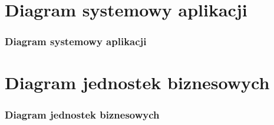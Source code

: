 \documentclass[hyperref={pdfpagelabels=false}]{beamer}
\begin{document}
\section[Diagram systemowy]{Diagram systemowy aplikacji}
\begin{frame}
	\frametitle{Diagram systemowy aplikacji}
	\begin{figure}
	\end{figure}
\end{frame}
\section[Diagram biznesowy]{Diagram jednostek biznesowych}
\begin{frame}
	\frametitle{Diagram jednostek biznesowych}
	\begin{figure}
	\end{figure}
\end{frame}
\end{document}
